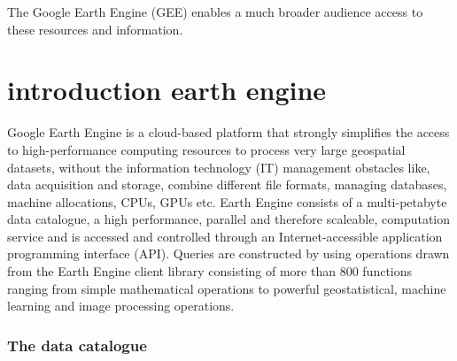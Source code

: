 \documentclass[11pt,twoside,a4paper,final]{report}
\begin{document}
The Google Earth Engine (GEE) enables a much broader audience access to these resources and information.

\section{introduction earth engine}

Google Earth Engine is a cloud-based platform that strongly simplifies the access to high-performance computing resources to process very large geospatial datasets, without the information technology (IT) management obstacles like, data acquisition and storage, combine different file formats, managing databases, machine allocations, CPUs, GPUs etc. 
Earth Engine consists of a multi-petabyte data catalogue, a high performance, parallel and therefore scaleable, computation service and is accessed and controlled through an Internet-accessible application programming interface (API).  Queries are constructed by using operations drawn from the Earth Engine client library consisting of more than 800 functions ranging from simple mathematical operations to powerful geostatistical, machine learning and image processing operations.

\subsubsection*{The data catalogue}
\end{document}

